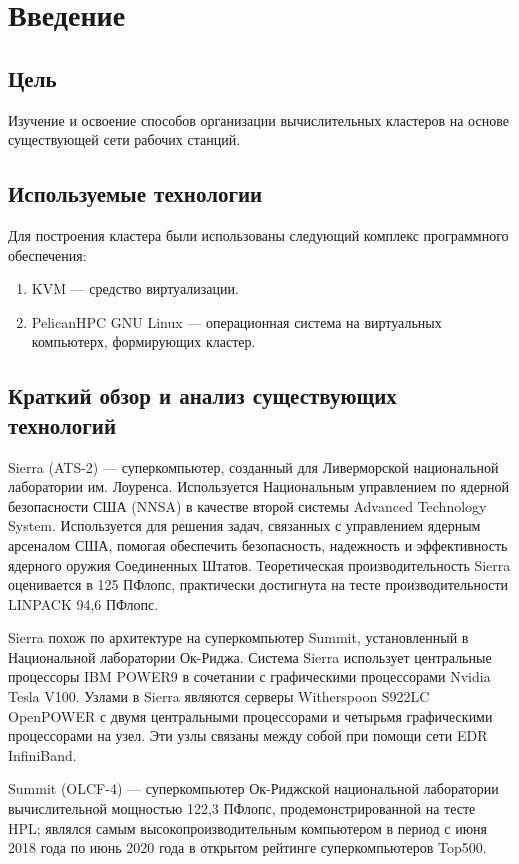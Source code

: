 \chapter{Введение}

\section{Цель}

Изучение и освоение способов организации вычислительных кластеров на основе существующей сети рабочих станций.

\section{Используемые технологии}
Для построения кластера были использованы следующий комплекс программного обеспечения:

\begin{enumerate}
  \item KVM --- средство виртуализации.
  \item PelicanHPC GNU Linux --- операционная система на виртуальных компьютерх, формирующих кластер.
\end{enumerate}

\section{Краткий обзор и анализ существующих технологий}

Sierra (ATS-2) — суперкомпьютер, созданный для Ливерморской национальной лаборатории им. Лоуренса. Используется Национальным управлением по ядерной безопасности США (NNSA) в качестве второй системы Advanced Technology System. Используется для решения задач, связанных с управлением ядерным арсеналом США, помогая обеспечить безопасность, надежность и эффективность ядерного оружия Соединенных Штатов. Теоретическая производительность Sierra оценивается в 125 ПФлопс, практически достигнута на тесте производительности LINPACK 94,6 ПФлопс.

Sierra похож по архитектуре на суперкомпьютер Summit, установленный в Национальной лаборатории Ок-Риджа. Система Sierra использует центральные процессоры IBM POWER9 в сочетании с графическими процессорами Nvidia Tesla V100. Узлами в Sierra являются серверы Witherspoon S922LC OpenPOWER с двумя центральными процессорами и четырьмя графическими процессорами на узел. Эти узлы связаны между собой при помощи сети EDR InfiniBand.

Summit (OLCF-4) — суперкомпьютер Ок-Риджской национальной лаборатории вычислительной мощностью 122,3 ПФлопс, продемонстрированной на тесте HPL; являлся самым высокопроизводительным компьютером в период с июня 2018 года по июнь 2020 года в открытом рейтинге суперкомпьютеров Top500.


